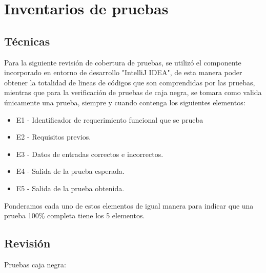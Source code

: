 \section{Inventarios de pruebas}

\subsection{Técnicas}
Para la siguiente revisión de cobertura de pruebas, se utilizó el componente incorporado en entorno de desarrollo "IntelliJ IDEA", de esta manera poder obtener la totalidad de lineas de códigos que son comprendidas por las pruebas, mientras que para la verificación de pruebas de caja negra, se tomara como valida únicamente una prueba, siempre y cuando contenga los siguientes elementos:
\begin{itemize}
    \item E1 - Identificador de requerimiento funcional que se prueba
    \item E2 - Requisitos previos.
    \item E3 - Datos de entradas correctos e incorrectos.
    \item E4 - Salida de la prueba esperada.
    \item E5 - Salida de la prueba obtenida.
\end{itemize}

Ponderamos cada uno de estos elementos de igual manera para indicar que una prueba 100\% completa tiene los 5 elementos.

\subsection{Revisión}
Pruebas caja negra:

